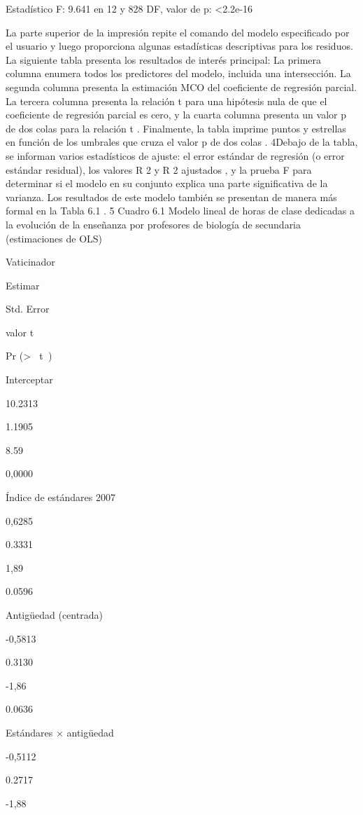 \documentclass[
]{book}
\begin{document}
Estadístico F: 9.641 en 12 y 828 DF, valor de p: \textless2.2e-16

La parte superior de la impresión repite el comando del modelo especificado por el usuario y luego proporciona algunas estadísticas descriptivas para los residuos. La siguiente tabla presenta los resultados de interés principal: La primera columna enumera todos los predictores del modelo, incluida una intersección. La segunda columna presenta la estimación MCO del coeficiente de regresión parcial. La tercera columna presenta la relación t para una hipótesis nula de que el coeficiente de regresión parcial es cero, y la cuarta columna presenta un valor p de dos colas para la relación t . Finalmente, la tabla imprime puntos y estrellas en función de los umbrales que cruza el valor p de dos colas . 4Debajo de la tabla, se informan varios estadísticos de ajuste: el error estándar de regresión (o error estándar residual), los valores R 2 y R 2 ajustados , y la prueba F para determinar si el modelo en su conjunto explica una parte significativa de la varianza. Los resultados de este modelo también se presentan de manera más formal en la Tabla 6.1 . 5
Cuadro 6.1
Modelo lineal de horas de clase dedicadas a la evolución de la enseñanza por profesores de biología de secundaria (estimaciones de OLS)

Vaticinador

Estimar

Std. Error

valor t

Pr (\textgreater{} \textbar{}  t  \textbar)

Interceptar

10.2313

1.1905

8.59

0,0000

Índice de estándares 2007

0,6285

0.3331

1,89

0.0596

Antigüedad (centrada)

-0,5813

0.3130

-1,86

0.0636

Estándares × antigüedad

-0,5112

0.2717

-1,88
\end{document}
